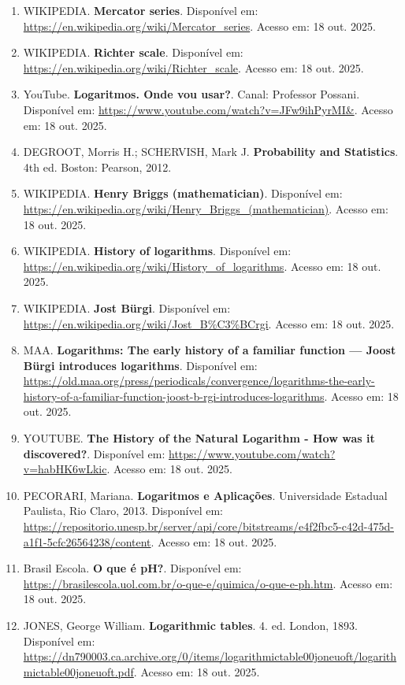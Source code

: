\begin{enumerate}
\item WIKIPEDIA. \textbf{Mercator series}. Disponível em: \url{https://en.wikipedia.org/wiki/Mercator_series}. Acesso em: 18 out. 2025.

\item WIKIPEDIA. \textbf{Richter scale}. Disponível em: \url{https://en.wikipedia.org/wiki/Richter_scale}. Acesso em: 18 out. 2025.

\item YouTube. \textbf{Logaritmos. Onde vou usar?}. Canal: Professor Possani. Disponível em: \url{https://www.youtube.com/watch?v=JFw9ihPyrMI&}. Acesso em: 18 out. 2025.

\item DEGROOT, Morris H.; SCHERVISH, Mark J. \textbf{Probability and Statistics}. 4th ed. Boston: Pearson, 2012.

\item WIKIPEDIA. \textbf{Henry Briggs (mathematician)}. Disponível em: \url{https://en.wikipedia.org/wiki/Henry_Briggs_(mathematician)}. Acesso em: 18 out. 2025.

\item WIKIPEDIA. \textbf{History of logarithms}. Disponível em: \url{https://en.wikipedia.org/wiki/History_of_logarithms}. Acesso em: 18 out. 2025.

\item WIKIPEDIA. \textbf{Jost Bürgi}. Disponível em: \url{https://en.wikipedia.org/wiki/Jost_B%C3%BCrgi}. Acesso em: 18 out. 2025.

\item MAA. \textbf{Logarithms: The early history of a familiar function — Joost Bürgi introduces logarithms}. Disponível em: \url{https://old.maa.org/press/periodicals/convergence/logarithms-the-early-history-of-a-familiar-function-joost-b-rgi-introduces-logarithms}. Acesso em: 18 out. 2025.

\item YOUTUBE. \textbf{The History of the Natural Logarithm - How was it discovered?}. Disponível em: \url{https://www.youtube.com/watch?v=habHK6wLkic}. Acesso em: 18 out. 2025.

\item PECORARI, Mariana. \textbf{Logaritmos e Aplicações}. Universidade Estadual Paulista, Rio Claro, 2013. Disponível em: \url{https://repositorio.unesp.br/server/api/core/bitstreams/e4f2fbc5-c42d-475d-a1f1-5cfc26564238/content}. Acesso em: 18 out. 2025.

\item Brasil Escola. \textbf{O que é pH?}. Disponível em: \url{https://brasilescola.uol.com.br/o-que-e/quimica/o-que-e-ph.htm}. Acesso em: 18 out. 2025.

\item JONES, George William. \textbf{Logarithmic tables}. 4. ed. London, 1893. Disponível em: \url{https://dn790003.ca.archive.org/0/items/logarithmictable00joneuoft/logarithmictable00joneuoft.pdf}. Acesso em: 18 out. 2025.


\end{enumerate}
